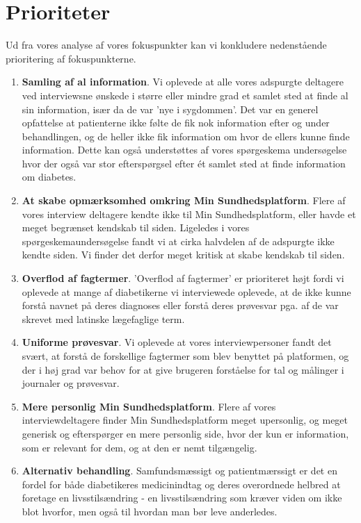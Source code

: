 \section{Prioriteter}
Ud fra vores analyse af vores fokuspunkter kan vi konkludere  nedenstående prioritering af fokuspunkterne.\\
\begin{enumerate}
	\item \textbf{Samling af al information}. Vi oplevede at alle vores adspurgte deltagere ved interviewsne ønskede i større eller mindre grad et samlet sted at finde al sin information, især da de var 'nye i sygdommen'. Det var en generel opfattelse at patienterne ikke følte de fik nok information efter og under behandlingen, og de heller ikke fik information om hvor de ellers kunne finde information. Dette kan også understøttes af vores spørgeskema undersøgelse hvor der også var stor efterspørgsel efter ét samlet sted at finde information om diabetes.
	\item \textbf{At skabe opmærksomhed omkring Min Sundhedsplatform}. Flere af vores interview deltagere kendte ikke til Min Sundhedsplatform, eller havde et meget begrænset kendskab til siden. Ligeledes i vores spørgeskemaundersøgelse fandt vi at cirka halvdelen af de adspurgte ikke kendte siden. Vi finder det derfor meget kritisk at skabe kendskab til siden.
	\item \textbf{Overflod af fagtermer}. 'Overflod af fagtermer' er prioriteret højt fordi vi oplevede at mange af diabetikerne vi interviewede oplevede, at de ikke kunne forstå navnet på deres diagnoses eller forstå deres prøvesvar pga. af de var skrevet med latinske lægefaglige term.
	\item \textbf{Uniforme prøvesvar}. Vi oplevede at vores interviewpersoner fandt det svært, at forstå de forskellige fagtermer som blev benyttet på platformen, og der i høj grad var behov for at give brugeren forståelse for tal og målinger i journaler og prøvesvar.
	\item \textbf{Mere personlig Min Sundhedsplatform}. Flere af vores interviewdeltagere finder Min Sundhedsplatform meget upersonlig, og meget generisk og efterspørger en mere personlig side, hvor der kun er information, som er relevant for dem, og at den er nemt tilgængelig.
	\item \textbf{Alternativ behandling}. Samfundsmæssigt og patientmærssigt er det en fordel for både diabetikeres medicinindtag og deres overordnede helbred at foretage en livsstilsændring - en livsstilsændring som kræver viden om ikke blot hvorfor, men også til hvordan man bør leve anderledes.

\end{enumerate}
